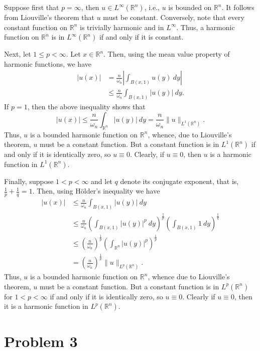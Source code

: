 \documentclass[10pt]{amsart}
\theoremstyle{thmstyle}
\theoremstyle{defstyle}
\newcommand{\R}{\mathbb{R}}
\renewcommand{\le}{\leqslant}
\begin{document}
Suppose first that $p = \infty$, then $u\in L^\infty(\R^n)$, i.e., $u$ is bounded on $\R^n$. It follows from Liouville's theorem that $u$ must be constant. Conversely, note that every constant function on $\R^n$ is trivially harmonic and in $L^\infty$. Thus, a harmonic function on $\R^n$ is in $L^\infty(\R^n)$ if and only if it is constant.

Next, let $1\le p < \infty$. Let $x\in\R^n$. Then, using the mean value property of harmonic functions, we have 
\begin{align*}
    |u(x)| &= \frac{n}{\omega_n}\left|\int_{B(x, 1)} u(y)~dy\right|\\
    &\le\frac{n}{\omega_n}\int_{B(x, 1)}|u(y)|~dy.
\end{align*}
If $p = 1$, then the above inequality shows that 
\begin{equation*}
    |u(x)|\le\frac{n}{\omega_n}\int_{\R^n}|u(y)|~dy = \frac{n}{\omega_n}\|u\|_{L^1(\R^n)}.
\end{equation*}
Thus, $u$ is a bounded harmonic function on $\R^n$, whence, due to Liouville's theorem, $u$ must be a constant function. But a constant function is in $L^1(\R^n)$ if and only if it is identically zero, so $u\equiv 0$. Clearly, if $u\equiv 0$, then $u$ is a harmonic function in $L^1(\R^n)$.

Finally, suppose $1 < p < \infty$ and let $q$ denote its conjugate exponent, that is, $\displaystyle\frac{1}{p} + \frac{1}{q} = 1$. Then, using H\"older's inequality we have 
\begin{align*}
    |u(x)|&\le\frac{n}{\omega_n}\int_{B(x, 1)}|u(y)|~dy\\
    &\le\frac{n}{\omega_n}\left(\int_{B(x, 1)}|u(y)|^p~dy\right)^{\frac{1}{p}}\left(\int_{B(x, 1)}1~dy\right)^\frac{1}{q}\\
    &\le\left(\frac{n}{\omega_n}\right)^{\frac{1}{p}}\left(\int_{\R^n}|u(y)|^p\right)^{\frac{1}{p}}\\
    &=\left(\frac{n}{\omega_n}\right)^{\frac{1}{p}}\|u\|_{L^p(\R^n)}.
\end{align*}
Thus, $u$ is a bounded harmonic function on $\R^n$, whence due to Liouville's theorem, $u$ must be a constant function. But a constant function is in $L^p(\R^n)$ for $1 < p < \infty$ if and only if it is identically zero, so $u\equiv 0$. Clearly if $u\equiv 0$, then it is a harmonic function in $L^p(\R^n)$.

\section{Problem 3}
\end{document}
